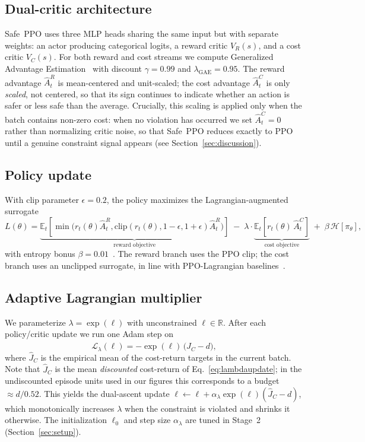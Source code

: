 \documentclass{article}
\newcommand{\eqnref}[1]{Eq.~\eqref{#1}}
\newcommand{\secref}[1]{Section~\ref{#1}}
\begin{document}
\subsection{Dual-critic architecture}
Safe~PPO uses three MLP heads sharing the same input but with separate weights:
an actor producing categorical logits, a reward critic $V_R(s)$, and a cost critic $V_C(s)$.
For both reward and cost streams we compute Generalized Advantage Estimation~\citep{schulman2016gae} with discount $\gamma{=}0.99$ and $\lambda_{\text{GAE}}{=}0.95$.
The reward advantage $\hat{A}_t^R$ is mean-centered and unit-scaled; the cost advantage
$\hat{A}_t^C$ is only \emph{scaled}, not centered, so that its sign continues to indicate
whether an action is safer or less safe than the average. Crucially, this scaling is applied
only when the batch contains non-zero cost: when no violation has occurred we set
$\hat{A}_t^C{=}0$ rather than normalizing critic noise, so that Safe~PPO reduces exactly to PPO
until a genuine constraint signal appears (see \secref{sec:discussion}).

\subsection{Policy update}
With clip parameter $\epsilon = 0.2$, the policy maximizes the Lagrangian-augmented surrogate
\begin{equation}
\label{eq:safeppo}
L(\theta) =
\underbrace{\mathbb{E}_t\!\left[ \min\bigl(r_t(\theta)\hat{A}^R_t, \mathrm{clip}(r_t(\theta), 1\!-\!\epsilon, 1\!+\!\epsilon)\hat{A}^R_t\bigr)\right]}_{\text{reward objective}}
\;-\;
\lambda \cdot
\underbrace{\mathbb{E}_t\!\left[ r_t(\theta)\,\hat{A}^C_t \right]}_{\text{cost objective}}
\;+\; \beta\,\mathcal{H}[\pi_\theta],
\end{equation}
with entropy bonus $\beta{=}0.01$~\citep{mnih2016a3c}. The reward branch uses the PPO clip; the cost branch uses an
unclipped surrogate, in line with PPO-Lagrangian baselines~\citep{ray2019benchmarking}.

\subsection{Adaptive Lagrangian multiplier}
We parameterize $\lambda = \exp(\ell)$ with unconstrained $\ell \in \mathbb{R}$. After each
policy/critic update we run one Adam step on
\begin{equation}
\label{eq:lambdaupdate}
\mathcal{L}_\lambda(\ell) = -\exp(\ell)\,\bigl(\hat{J}_C - d\bigr),
\end{equation}
where $\hat{J}_C$ is the empirical mean of the cost-return targets in the current batch.
Note that $\hat{J}_C$ is the mean \emph{discounted} cost-return of \eqnref{eq:lambdaupdate}; in the undiscounted episode units used in our figures this corresponds to a budget ${\approx}d/0.52$.
This yields the dual-ascent update $\ell \leftarrow \ell + \alpha_\lambda \exp(\ell)(\hat{J}_C - d)$,
which monotonically increases $\lambda$ when the constraint is violated and shrinks it otherwise.
The initialization $\ell_0$ and step size $\alpha_\lambda$ are tuned in Stage~2 (\secref{sec:setup}).
\end{document}
